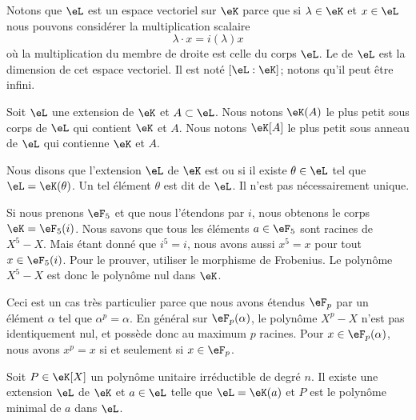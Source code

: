 Notons que \( \eL\) est un espace vectoriel sur \( \eK\) parce que si \( \lambda\in \eK\) et \( x\in \eL\) nous pouvons considérer la multiplication scalaire
\begin{equation}
    \lambda\cdot x=i(\lambda)x
\end{equation}
où la multiplication du membre de droite est celle du corps \( \eL\). Le  de \( \eL\) est la dimension de cet espace vectoriel. Il est noté \( [\eL:\eK]\); notons qu'il peut être infini.

Soit \( \eL\) une extension de \( \eK\) et \( A\subset \eL\). Nous notons \( \eK(A)\) le plus petit sous corps de \( \eL\) qui contient \( \eK\) et \( A\). Nous notons \( \eK[A]\) le plus petit sous anneau de \( \eL\) qui contienne \( \eK\) et \( A\).

Nous disons que l'extension \( \eL\) de \( \eK\) est  ou  si il existe \( \theta\in\eL\) tel que \( \eL=\eK(\theta)\). Un tel élément \( \theta\) est dit  de \( \eL\). Il n'est pas nécessairement unique.


\begin{example} \label{ExLQhLhJ}
    Si nous prenons \( \eF_5\) et que nous l'étendons par \( i\), nous obtenons le corps \( \eK=\eF_5(i)\). Nous savons que tous les éléments \( a\in \eF_5\) sont racines de \( X^5-X\). Mais étant donné que \( i^5=i\), nous avons aussi \( x^5=x\) pour tout \( x\in \eF_5(i)\). Pour le prouver, utiliser le morphisme de Frobenius. Le polynôme \( X^5-X\) est donc le polynôme nul dans \( \eK\).

    Ceci est un cas très particulier parce que nous avons étendus \( \eF_p\) par un élément \( \alpha\) tel que \( \alpha^p=\alpha\). En général sur \( \eF_p(\alpha)\), le polynôme \( X^p-X\) n'est pas identiquement nul, et possède donc au maximum \( p\) racines. Pour \( x\in \eF_p(\alpha)\), nous avons \( x^p=x\) si et seulement si \( x\in \eF_p\).
\end{example}

\begin{lemma}
    Soit \( P\in\eK[X]\) un polynôme unitaire irréductible de degré \( n\). Il existe une extension \( \eL\) de \( \eK\) et \( a\in \eL\) telle que \( \eL=\eK(a)\) et \( P\) est le polynôme minimal de \( a\) dans \( \eL\).
\end{lemma}

